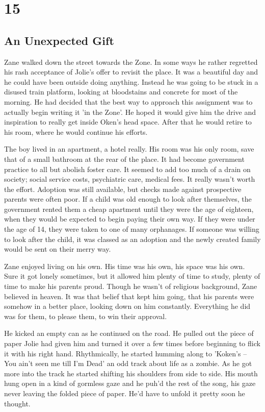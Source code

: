 \chapter{15}
\section{An Unexpected Gift}


Zane walked down the street towards the Zone.  In some ways he rather regretted his rash acceptance of Jolie's offer to revisit the place.  It was a beautiful day and he could have been outside doing anything.  Instead he was going to be stuck in a disused train platform, looking at bloodstains and concrete for most of the morning.  He had decided that the best way to approach this assignment was to actually begin writing it 'in the Zone'.  He hoped it would give him the drive and inspiration to really get inside Oken's head space.  After that he would retire to his room, where he would continue his efforts.  

The boy lived in an apartment, a hotel really.  His room was his only room, save that of a small bathroom at the rear of the place.  It had become government practice to all but abolish foster care.  It seemed to add too much of a drain on society; social service costs, psychiatric care, medical fees.  It really wasn't worth the effort.  Adoption was still available, but checks made against prospective parents were often poor.  If a child was old enough to look after themselves, the government rented them a cheap apartment until they were the age of eighteen, when they would be expected to begin paying their own way.  If they were under the age of 14, they were taken to one of many orphanages.  If someone was willing to look after the child, it was classed as an adoption and the newly created family would be sent on their merry way.

Zane enjoyed living on his own.  His time was his own, his space was his own.  Sure it got lonely sometimes, but it allowed him plenty of time to study, plenty of time to make his parents proud.  Though he wasn't of religious background, Zane believed in heaven.  It was that belief that kept him going, that his parents were somehow in a better place, looking down on him constantly.  Everything he did was for them, to please them, to win their approval.  

He kicked an empty can as he continued on the road.  He pulled out the piece of paper Jolie had given him and turned it over a few times before beginning to flick it with his right hand.  Rhythmically, he started humming along to 'Koken's – You ain't seen me till I'm Dead' an odd track about life as a zombie.  As he got more into the track he started shifting his shoulders from side to side.  His mouth hung open in a kind of gormless gaze and he puh'd the rest of the song, his gaze never leaving the folded piece of paper.    He'd have to unfold it pretty soon he thought.  

